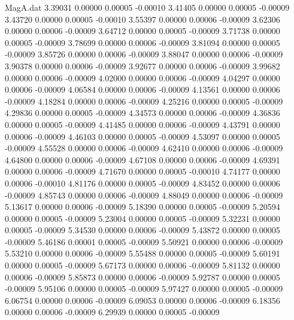 \begin{filecontents}{MagA.dat}
   3.39031    0.00000    0.00005   -0.00010
   3.41405    0.00000    0.00005   -0.00009
   3.43720    0.00000    0.00005   -0.00010
   3.55397    0.00000    0.00006   -0.00009
   3.62306    0.00000    0.00006   -0.00009
   3.64712    0.00000    0.00005   -0.00009
   3.71738    0.00000    0.00005   -0.00009
   3.78699    0.00000    0.00006   -0.00009
   3.81094    0.00000    0.00005   -0.00009
   3.85726    0.00000    0.00006   -0.00009
   3.88047    0.00000    0.00006   -0.00009
   3.90378    0.00000    0.00006   -0.00009
   3.92677    0.00000    0.00006   -0.00009
   3.99682    0.00000    0.00006   -0.00009
   4.02000    0.00000    0.00006   -0.00009
   4.04297    0.00000    0.00006   -0.00009
   4.06584    0.00000    0.00006   -0.00009
   4.13561    0.00000    0.00006   -0.00009
   4.18284    0.00000    0.00006   -0.00009
   4.25216    0.00000    0.00005   -0.00009
   4.29836    0.00000    0.00005   -0.00009
   4.34573    0.00000    0.00006   -0.00009
   4.36836    0.00000    0.00005   -0.00009
   4.41485    0.00000    0.00006   -0.00009
   4.43791    0.00000    0.00006   -0.00009
   4.46103    0.00000    0.00005   -0.00009
   4.53097    0.00000    0.00005   -0.00009
   4.55528    0.00000    0.00006   -0.00009
   4.62410    0.00000    0.00006   -0.00009
   4.64800    0.00000    0.00006   -0.00009
   4.67108    0.00000    0.00006   -0.00009
   4.69391    0.00000    0.00006   -0.00009
   4.71670    0.00000    0.00005   -0.00010
   4.74177    0.00000    0.00006   -0.00010
   4.81176    0.00000    0.00005   -0.00009
   4.83452    0.00000    0.00006   -0.00009
   4.85743    0.00000    0.00006   -0.00009
   4.88049    0.00000    0.00006   -0.00009
   5.13617    0.00000    0.00006   -0.00009
   5.18390    0.00000    0.00005   -0.00009
   5.20594    0.00000    0.00005   -0.00009
   5.23004    0.00000    0.00005   -0.00009
   5.32231    0.00000    0.00005   -0.00009
   5.34530    0.00000    0.00006   -0.00009
   5.43872    0.00000    0.00005   -0.00009
   5.46186    0.00001    0.00005   -0.00009
   5.50921    0.00000    0.00006   -0.00009
   5.53210    0.00000    0.00006   -0.00009
   5.55488    0.00000    0.00005   -0.00009
   5.60191    0.00000    0.00005   -0.00009
   5.67173    0.00000    0.00006   -0.00009
   5.81132    0.00000    0.00006   -0.00009
   5.85873    0.00000    0.00006   -0.00009
   5.92787    0.00000    0.00005   -0.00009
   5.95106    0.00000    0.00005   -0.00009
   5.97427    0.00000    0.00005   -0.00009
   6.06754    0.00000    0.00006   -0.00009
   6.09053    0.00000    0.00006   -0.00009
   6.18356    0.00000    0.00006   -0.00009
   6.29939    0.00000    0.00005   -0.00009

\end{filecontents}
